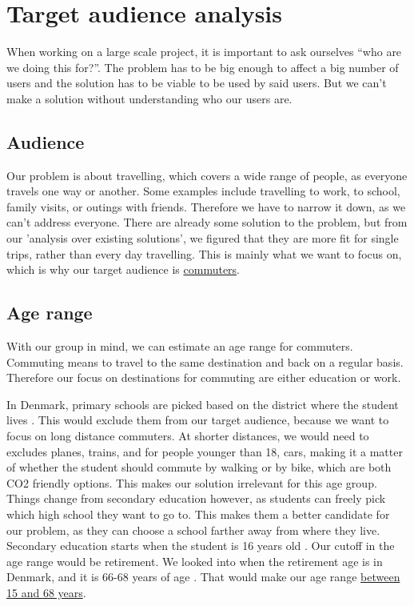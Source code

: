 \section{Target audience analysis}

When working on a large scale project, it is important to ask ourselves ``who are we doing this for?''. The problem has to be big enough to affect a big number of users and the solution has to be viable to be used by said users. But we can't make a solution without understanding who our users are. 

\subsection{Audience}

Our problem is about travelling, which covers a wide range of people, as everyone travels one way or another. Some examples include travelling to work, to school, family visits, or outings with friends. Therefore we have to narrow it down, as we can't address everyone. There are already some solution to the problem, but from our 'analysis over existing solutions', we figured that they are more fit for single trips, rather than every day travelling. This is mainly what we want to focus on, which is why our target audience is \underline{commuters}. 

\subsection{Age range}

With our group in mind, we can estimate an age range for commuters. Commuting means to travel to the same destination and back on a regular basis. Therefore our focus on destinations for commuting are either education or work. 

In Denmark, primary schools are picked based on the district where the student lives \cite{primary_school}. This would exclude them from our target audience, because we want to focus on long distance commuters. At shorter distances, we would need to excludes planes, trains, and for people younger than 18, cars, making it a matter of whether the student should commute by walking or by bike, which are both CO2 friendly options. This makes our solution irrelevant for this age group. Things change from secondary education however, as students can freely pick which high school they want to go to. This makes them a better candidate for our problem, as they can choose a school farther away from where they live. Secondary education starts when the student is 16 years old \cite{secondary_school}. Our cutoff in the age range would be retirement. We looked into when the retirement age is in Denmark, and it is 66-68 years of age \cite{retirement}. That would make our age range \underline{between 15 and 68 years}.

